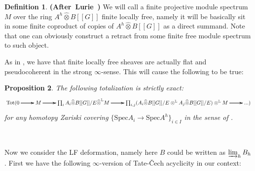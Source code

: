 \documentclass[12pt]{amsart}
\newtheorem{theorem}{Theorem}[section]
\newtheorem{proposition}[theorem]{Proposition}
\theoremstyle{definition}
\newtheorem{definition}[theorem]{Definition}
\numberwithin{equation}{section}
\begin{document}
\begin{definition} \mbox{\bf{(After Lurie \cite[Definition 2.9.1.1]{Lu1})}} We will call a finite projective module spectrum $M$ over the ring $A^h\widehat{\otimes}B[[G]]$ finite locally free, namely it will be basically sit in some finite coproduct of copies of $A^h\widehat{\otimes}B[[G]]$ as a direct summand. Note that one can obviously construct a retract from some finite free module spectrum to such object.
	
\end{definition}


\indent As in \cite[Proposition 7.2.4.20]{Lu2}, we have that finite locally free sheaves are actually flat and pseudocoherent in the strong $\infty$-sense. This will cause the following to be true:



\begin{proposition} 
The following totalization is strictly exact:
\[
\xymatrix@C+0pc@R+0pc{
\mathrm{Tot}(0  \ar[r]\ar[r]\ar[r] &M \ar[r]\ar[r]\ar[r] & \prod_i A_i\widehat{\otimes} B[[G]]/E \widehat{\otimes}^\mathbb{L} M  \ar[r]\ar[r]\ar[r] &\prod_{i,j} (A_i\widehat{\otimes} B[[G]]/E \otimes^\mathbb{L} A_j\widehat{\otimes} B[[G]]/E) \otimes^\mathbb{L} M\ar[r]\ar[r]\ar[r] &...)
}
\]
for any homotopy Zariski covering $\{\mathrm{Spec}A_i\rightarrow \mathrm{Spec}A^h\}_{i\in I}$ in the sense of \cite[Theorem 4.15, Theorem 2.15]{BK1}. 
\end{proposition}





%
%


\


 \indent Now we consider the LF deformation, namely here $B$ could be written as $\varinjlim_h B_h$. First we have the following $\infty$-version of Tate-\v{C}ech acyclicity in our context:
\end{document}
